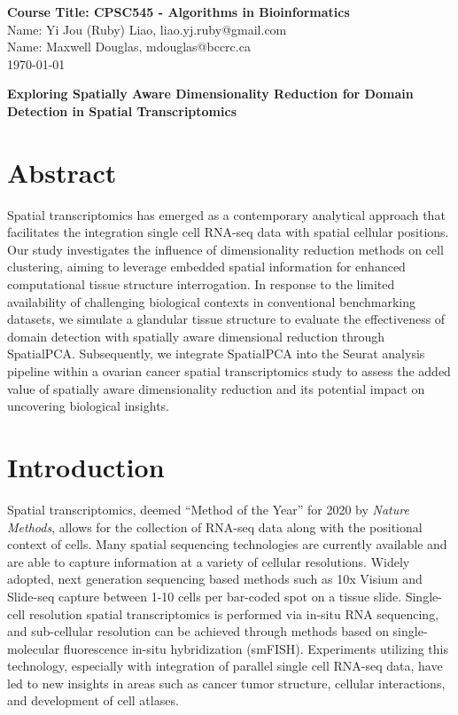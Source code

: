 \documentclass{article}
\begin{document}
\begin{flushleft}
\textbf{Course Title: CPSC545 - Algorithms in Bioinformatics} \\
Name: Yi Jou (Ruby) Liao, liao.yj.ruby@gmail.com \\
Name: Maxwell Douglas, mdouglas@bccrc.ca \\
\today
\end{flushleft}

\begin{center}
  \Large\textbf{Exploring Spatially Aware Dimensionality Reduction for Domain Detection in Spatial Transcriptomics}
\end{center}

\section*{Abstract}

Spatial transcriptomics has emerged as a contemporary analytical approach that facilitates the integration single cell RNA-seq data with spatial cellular positions. Our study investigates the influence of dimensionality reduction methods on cell clustering, aiming to leverage embedded spatial information for enhanced computational tissue structure interrogation. In response to the limited availability of challenging biological contexts in conventional benchmarking datasets, we simulate a glandular tissue structure to evaluate the effectiveness of domain detection with spatially aware dimensional reduction through SpatialPCA. Subsequently, we integrate SpatialPCA into the Seurat analysis pipeline within a ovarian cancer spatial transcriptomics study to assess the added value of spatially aware dimensionality reduction and its potential impact on uncovering biological insights.

\section*{Introduction}

Spatial transcriptomics, deemed “Method of the Year'' for 2020 by \textit{Nature Methods}\citep{marx2021}, allows for the collection of RNA-seq data along with the positional context of cells. Many spatial sequencing technologies are currently available and are able to capture information at a variety of cellular resolutions. Widely adopted, next generation sequencing based methods such as 10x Visium and Slide-seq\citep{rodriques_slideseq_2019} capture between 1-10 cells per bar-coded spot on a tissue slide. Single-cell resolution spatial transcriptomics is performed via in-situ RNA sequencing, and sub-cellular resolution can be achieved through methods based on single-molecular fluorescence in-situ hybridization (smFISH)\citep{williams_introduction_2022}. Experiments utilizing this technology, especially with integration of parallel single cell RNA-seq data, have led to new insights in areas such as cancer tumor structure\citep{lyubetskaya2022}, cellular interactions\citep{cang2023}, and development of cell atlases\citep{cui2023}.
\end{document}
